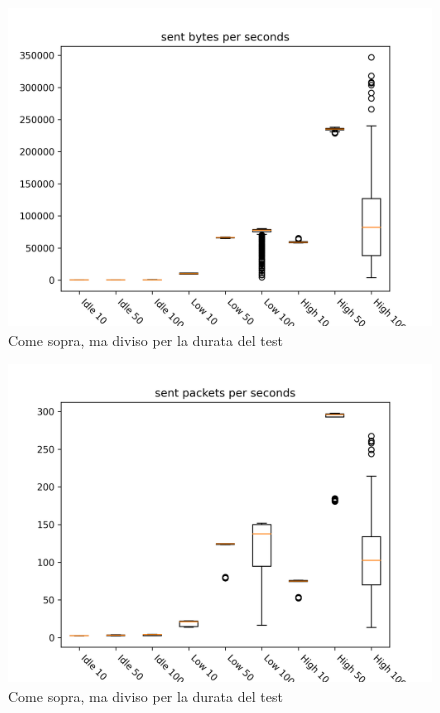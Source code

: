 \documentclass[target=bach]{thud}
\begin{document}
\begin{figure}[H]
    \includegraphics[width=\linewidth, height=0.4\textheight, keepaspectratio]{graphs/sent bytes per seconds.png}
    \caption{Come sopra, ma diviso per la durata del test}
    \label{fig:sbps}
\end{figure}

\begin{figure}[H]
    \includegraphics[width=\linewidth, height=0.4\textheight, keepaspectratio]{graphs/sent packets per seconds.png}
    \caption{Come sopra, ma diviso per la durata del test}
    \label{fig:spps}
\end{figure}
\end{document}
